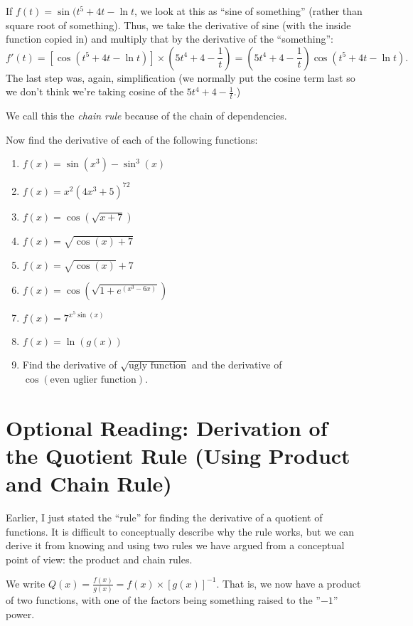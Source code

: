 \documentclass{ximera}
\begin{document}
If  $f(t) = \sin(t^5+4t-\ln t$, we look at this as ``sine of something'' (rather than square root of something).  Thus, we take the derivative of sine (with the inside function copied in) and multiply that by the derivative of the ``something'':
\[
f'(t) = [\cos(t^5+4t-\ln t)] \times \left (5t^4+4-\frac{1}{t} \right) = \left (5t^4+4-\frac{1}{t} \right)\cos(t^5+4t-\ln t).
\]
The last step was, again, simplification (we normally put the cosine term last so we don't think we're taking cosine of the  $5t^4+4-\frac{1}{t}$.)


     We call this the {\em chain rule} because of the chain of dependencies.


\begin{exercise}
Now find the derivative of each of the following functions:
\begin{enumerate}
    \item $f(x) = \sin(x^3) - \sin^3(x)$
    \item $f(x) = x^2(4x^3+5)^{72}$
    \item $f(x) = \cos(\sqrt{x+7})$
    \item $f(x) = \sqrt{\cos(x) +7}$
    \item $f(x) = \sqrt{\cos(x)} + 7$
    \item $f(x) = \cos \left ( \sqrt{1+e^{(x^3-6x)}}\right )$
    \item $f(x) = 7^{x^5\sin(x)}$
    \item $f(x) = \ln(g(x))$
    \item Find the derivative of $\sqrt{\text{ugly function}}$ and the derivative of \\ $\cos(\text{even uglier function})$.
\end{enumerate}
\end{exercise}
 
\section*{Optional Reading: Derivation of the Quotient Rule (Using Product and Chain Rule)}

Earlier, I just stated the ``rule'' for finding the derivative of a quotient of functions.  It is difficult to conceptually describe why the rule works, but we can derive it from knowing and using two rules we have argued from a conceptual point of view:  the product and chain rules.

We write  $Q(x) = \frac{f(x)}{g(x)} = f(x) \times [g(x)]^{-1}$.  That is, we now have a product of two functions, with one of the factors being something raised to the ''$-1$'' power.
\end{document}
